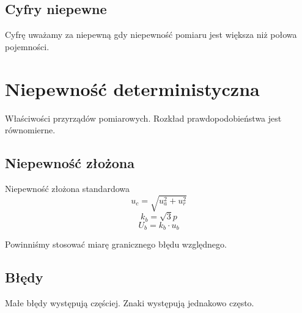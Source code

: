 \documentclass[11pt]{article}
\begin{document}
\subsection{Cyfry niepewne}
Cyfrę uważamy za niepewną gdy niepewność pomiaru jest większa niż połowa pojemności.

\section{Niepewność deterministyczna}
Właściwości przyrządów pomiarowych. Rozkład prawdopodobieństwa jest równomierne. 

\subsection{Niepewność złożona}
Niepewność złożona standardowa
$$ u_c =\sqrt{ u_a^2 + u_r^2 } $$
$$ k_b = \sqrt{3} p $$
$$ U_b = k_b \cdot u_b $$

Powinniśmy stosować miarę granicznego błędu względnego.

\subsection{Błędy}
Małe błędy występują częściej. Znaki występują jednakowo często.
\end{document}
